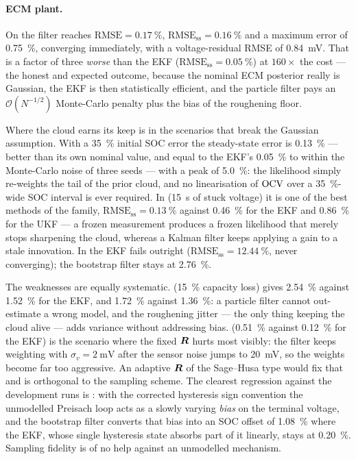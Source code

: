 \paragraph{ECM plant.}  On  the filter reaches $\mathrm{RMSE} = \SI{0.17}{\percent}$,
$\mathrm{RMSE}_{\mathrm{ss}} = \SI{0.16}{\percent}$ and a maximum error of \SI{0.75}{\percent},
converging immediately, with a voltage-residual RMSE of \SI{0.84}{\milli\volt}.  That is a factor
of three \emph{worse} than the EKF ($\mathrm{RMSE}_{\mathrm{ss}} = \SI{0.05}{\percent}$) at
$160\times$ the cost --- the honest and expected outcome, because the nominal ECM posterior really
is Gaussian, the EKF is then statistically efficient, and the particle filter pays an
$\mathcal{O}(N^{-1/2})$ Monte-Carlo penalty plus the bias of the roughening floor.

Where the cloud earns its keep is in the scenarios that break the Gaussian assumption.  With a
\SI{35}{\percent} initial SOC error the steady-state error is \SI{0.13}{\percent} --- better than
its own nominal value, and equal to the EKF's \SI{0.05}{\percent} to within the Monte-Carlo noise
of three seeds --- with a peak of \SI{5.0}{\percent}: the likelihood simply re-weights the tail of
the prior cloud, and no linearisation of $\mathrm{OCV}$ over a \SI{35}{\percent}-wide SOC interval is ever
required.  In  (\SI{15}{\second} of stuck voltage) it is one of the best
methods of the family, $\mathrm{RMSE}_{\mathrm{ss}} = \SI{0.13}{\percent}$ against
\SI{0.46}{\percent} for the EKF and \SI{0.86}{\percent} for the UKF --- a frozen measurement
produces a frozen likelihood that merely stops sharpening the cloud, whereas a Kalman filter keeps
applying a gain to a stale innovation.  In  the EKF fails outright
($\mathrm{RMSE}_{\mathrm{ss}} = \SI{12.44}{\percent}$, never converging); the bootstrap filter
stays at \SI{2.76}{\percent}.

The weaknesses are equally systematic.   (\SI{15}{\percent} capacity loss) gives
\SI{2.54}{\percent} against \SI{1.52}{\percent} for the EKF, and 
\SI{1.72}{\percent} against \SI{1.36}{\percent}: a particle filter cannot out-estimate a wrong
model, and the roughening jitter --- the only thing keeping the cloud alive --- adds variance
without addressing bias.   (\SI{0.51}{\percent} against \SI{0.12}{\percent} for
the EKF) is the scenario where the fixed $\bm{R}$ hurts most visibly: the filter keeps weighting with
$\sigma_v = \SI{2}{\milli\volt}$ after the sensor noise jumps to \SI{20}{\milli\volt}, so the
weights become far too aggressive.  An adaptive $\bm{R}$ of the Sage--Husa type \cite{sagehusa1969}
would fix that and is orthogonal to the sampling scheme.  The clearest regression against the
development runs is : with the corrected hysteresis sign convention the unmodelled
Preisach loop acts as a slowly varying \emph{bias} on the terminal voltage, and the bootstrap
filter converts that bias into an SOC offset of \SI{1.08}{\percent} where the EKF, whose single
hysteresis state absorbs part of it linearly, stays at \SI{0.20}{\percent}.  Sampling fidelity is
of no help against an unmodelled mechanism.

